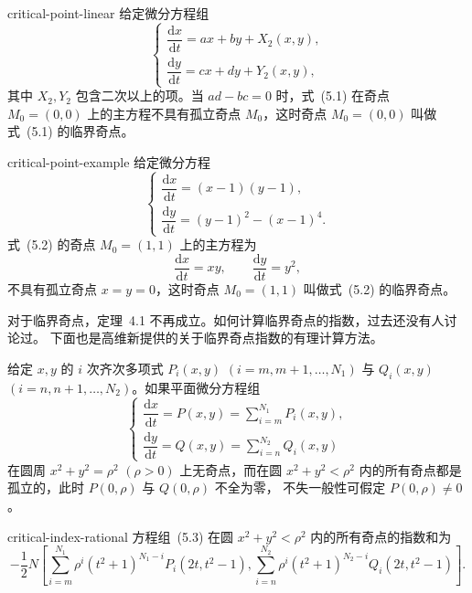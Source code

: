 \begin{example}{}{critical-point-linear}
给定微分方程组
\[
\begin{cases}
\dfrac{\mathrm{d}x}{\mathrm{d}t}=ax+by+X_2(x,y),\\
\dfrac{\mathrm{d}y}{\mathrm{d}t}=cx+dy+Y_2(x,y),
\end{cases} \tag{5.1}
\]
其中 $X_2,Y_2$ 包含二次以上的项。当 $ad-bc=0$ 时，式~(5.1) 在奇点
$M_0=(0,0)$ 上的主方程不具有孤立奇点 $M_0$，这时奇点 $M_0=(0,0)$
叫做式~(5.1) 的临界奇点。
\end{example}

\begin{example}{}{critical-point-example}
给定微分方程
\[
\begin{cases}
\dfrac{\mathrm{d}x}{\mathrm{d}t}=(x-1)(y-1),\\
\dfrac{\mathrm{d}y}{\mathrm{d}t}=(y-1)^2-(x-1)^4.
\end{cases} \tag{5.2}
\]
式~(5.2) 的奇点 $M_0=(1,1)$ 上的主方程为
\[
\dfrac{\mathrm{d}x}{\mathrm{d}t}=xy,\qquad
\dfrac{\mathrm{d}y}{\mathrm{d}t}=y^2,
\]
不具有孤立奇点 $x=y=0$，这时奇点 $M_0=(1,1)$ 叫做式~(5.2) 的临界奇点。
\end{example}

对于临界奇点，定理~4.1 不再成立。如何计算临界奇点的指数，过去还没有人讨论过。
下面也是高维新提供的关于临界奇点指数的有理计算方法。

给定 $x,y$ 的 $i$ 次齐次多项式 $P_i(x,y)$ $(i=m,m+1,\ldots,N_1)$ 与
$Q_i(x,y)$ $(i=n,n+1,\ldots,N_2)$。如果平面微分方程组
\[
\begin{cases}
\dfrac{\mathrm{d}x}{\mathrm{d}t}=P(x,y)=\displaystyle\sum_{i=m}^{N_1}P_i(x,y),\\[4pt]
\dfrac{\mathrm{d}y}{\mathrm{d}t}=Q(x,y)=\displaystyle\sum_{i=n}^{N_2}Q_i(x,y)
\end{cases} \tag{5.3}
\]
在圆周 $x^2+y^2=\rho^2$ $(\rho>0)$ 上无奇点，而在圆 $x^2+y^2<\rho^2$
内的所有奇点都是孤立的，此时 $P(0,\rho)$ 与 $Q(0,\rho)$ 不全为零，
不失一般性可假定 $P(0,\rho)\ne0$。

\begin{theorem}{}{critical-index-rational}
方程组~(5.3) 在圆 $x^2+y^2<\rho^2$ 内的所有奇点的指数和为
\[
-\dfrac12N\left[
\sum_{i=m}^{N_1}\rho^i(t^2+1)^{N_1-i}P_i(2t,t^2-1),
\sum_{i=n}^{N_2}\rho^i(t^2+1)^{N_2-i}Q_i(2t,t^2-1)
\right].
\]
\end{theorem}

